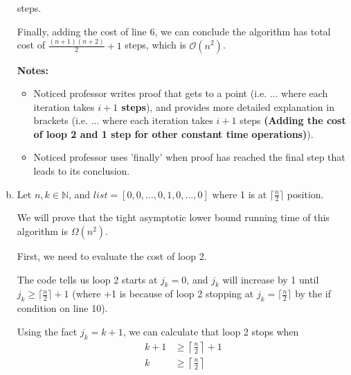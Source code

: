 \documentclass[12pt]{article}
\begin{document}
\begin{enumerate}[a.]
\begin{mdframed}
        steps.

        \bigskip

        Finally, adding the cost of line 6, we can conclude the algorithm has total
        cost of $\frac{(n+1)(n+2)}{2} + 1$ steps, which is $\mathcal{O}(n^2)$.
        \color{black}
    \end{mdframed}

    \bigskip

    \textbf{Notes:}

    \begin{itemize}
        \item Noticed professor writes proof that gets to a point (i.e. ... where
        each iteration takes \textbf{$i + 1$ steps}), and provides more detailed explanation
        in brackets (i.e. ... where each iteration takes $i + 1$ steps \textbf{(Adding
        the cost of loop 2 and 1 step for other constant time operations)}).

        \item Noticed professor uses 'finally' when proof has reached the final
        step that leads to its conclusion.
    \end{itemize}

    \item

    Let $n,k \in \mathbb{N}$, and $list = [0,0,\dots,0,1,0,\dots,0]$ where 1 is
    at $\lceil \frac{n}{2} \rceil$ position.

    \bigskip

    We will prove that the tight asymptotic lower bound running time of this
    algorithm is $\Omega(n^2)$.

    \bigskip

    First, we need to evaluate the cost of loop 2.

    \bigskip

    The code tells us loop 2 starts at $j_k = 0$, and $j_k$ will increase by 1 until
    $j_k \geq \lceil \frac{n}{2} \rceil + 1$ (where +1 is because of loop 2
    stopping at $j_k = \lceil \frac{n}{2} \rceil$ by the if condition on line 10).

    \bigskip

    Using the fact $j_k = k+1$, we can calculate that loop 2 stops when
    \setcounter{equation}{0}
    \begin{align}
        k+1 &\geq \left\lceil \frac{n}{2} \right\rceil + 1\\
        k &\geq \left\lceil \frac{n}{2} \right\rceil
    \end{align}


\end{enumerate}
\end{document}
